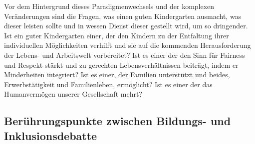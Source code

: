 Vor dem Hintergrund dieses Paradigmenwechsels und der komplexen Veränderungen sind die Fragen, was einen guten Kindergarten ausmacht, was dieser leisten sollte und in wessen Dienst dieser gestellt wird, um so dringender. Ist ein guter Kindergarten einer, der den Kindern zu der Entfaltung ihrer individuellen Möglichkeiten verhilft und sie auf die kommenden Herausforderung der Lebens- und Arbeitswelt vorbereitet? Ist es einer der den Sinn für Fairness und Respekt stärkt und zu gerechten Lebensverhältnissen beiträgt, indem er Minderheiten integriert? Ist es einer, der Familien unterstützt und beides,  Erwerbstätigkeit und Familienleben, ermöglicht? Ist es einer der das Humanvermögen unserer Gesellschaft mehrt? 

\subsection{Berührungspunkte zwischen Bildungs- und Inklusionsdebatte}


